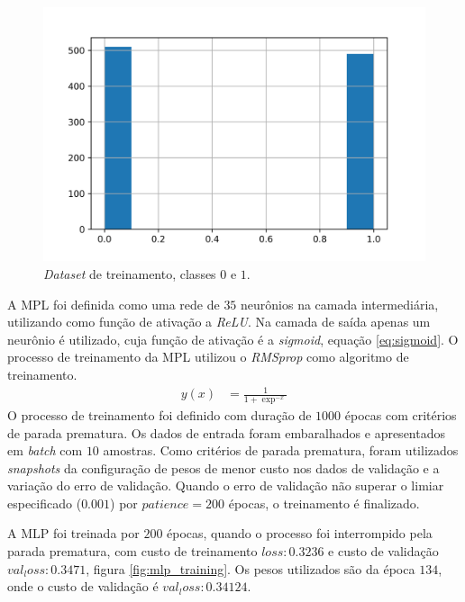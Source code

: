 \documentclass{article}
\begin{document}
    \begin{figure}[H]
        \centering
        \includegraphics[width=\linewidth]{mlp_out_scaled.png}   
        \caption{\textit{Dataset} de treinamento, classes $0$ e $1$.}
        \label{fig:out_data_scaled}
    \end{figure}
    A MPL foi definida como uma rede de $35$ neurônios na camada intermediária, utilizando
    como função de ativação a \textit{ReLU}. Na camada de saída apenas um neurônio é utilizado,
    cuja função de ativação é a \textit{sigmoid}, equação \ref{eq:sigmoid}.
    O processo de treinamento da MPL utilizou o \textit{RMSprop} como algoritmo de treinamento.
    \begin{align}
        y(x) &= \frac{1}{1 + \exp^{-x}}
        \label{eq:sigmoid}
    \end{align}
    O processo de treinamento foi definido com duração de $1000$ épocas com critérios de 
    parada prematura. Os dados de entrada foram embaralhados e apresentados
    em \textit{batch} com $10$ amostras.
    Como critérios de parada prematura, foram utilizados \textit{snapshots} da configuração de pesos
    de menor custo nos dados de validação e a variação do erro de validação.
    Quando o erro de validação não superar o limiar especificado ($0.001$) por $patience=200$ épocas,
    o treinamento é finalizado.
    
    A MLP foi treinada por $200$ épocas, quando o processo foi interrompido pela
    parada prematura, com custo de treinamento $loss: 0.3236$ e custo de validação
    $val_loss: 0.3471$, figura \ref{fig:mlp_training}. Os pesos utilizados são da época $134$, onde o custo de validação
    é $val_loss: 0.34124$.
\end{document}
